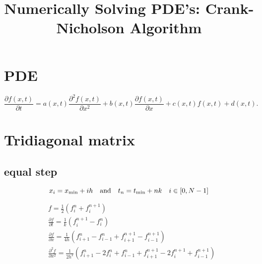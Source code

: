 \documentclass{article}
\begin{document}
\title{Numerically Solving PDE's: Crank-Nicholson Algorithm}
\maketitle

\section{PDE}
    \begin{equation}
        \frac{\partial f(x,t)}{\partial t} = 
        a(x,t) \frac{\partial^2 f(x,t)}{\partial x^2}
        + b(x,t) \frac{\partial f(x,t)}{\partial x}
        + c(x,t) f(x,t)
        + d(x,t).
    \end{equation}

\section{Tridiagonal matrix}
\subsection{equal step}
    \begin{equation}
        x_i = x_{\min} + ih \quad  {\rm and} \quad t_n = t_{\min} + nk \quad i \in [0, N-1]
    \end{equation}

    \begin{equation}
        \begin{split}
            & f = \frac{1}{2} \left( f_i^n + f_i^{n+1} \right)
            \\
            & \frac{\partial f}{\partial t} = \frac{1}{k}
            \left(f_i^{n+1} - f_i^n\right) 
            \\
            & \frac{\partial f}{\partial x} = \frac{1}{4h}
                \left( f_{i+1}^n - f_{i-1}^n + f_{i+1}^{n+1} - f_{i-1}^{n+1} \right) 
            \\
            & \frac{\partial^2 f}{\partial x^2} = \frac{1}{2h^2}
                \left( f_{i+1}^n - 2f_i^{n} + f_{i-1}^n
                     + f_{i+1}^{n+1} - 2f_i^{n+1} +f_{i-1}^{n+1} \right)
        \end{split}
    \end{equation}
\end{document}
